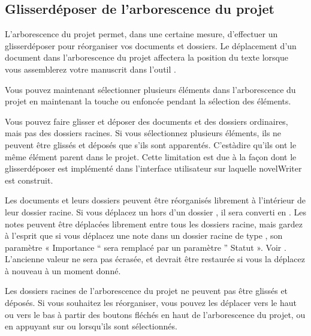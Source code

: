 \documentclass[a4paper,11pt,french]{sphinxmanual}
\begin{document}
\subsection{Glisser\sphinxhyphen{}déposer de l’arborescence du projet}
\label{\detokenize{usage_project:project-tree-drag-drop}}\label{\detokenize{usage_project:a-ui-tree-dnd}}
\sphinxAtStartPar
L’arborescence du projet permet, dans une certaine mesure, d’effectuer un glisser\sphinxhyphen{}déposer pour réorganiser vos documents et dossiers. Le déplacement d’un document dans l’arborescence du projet affectera la position du texte lorsque vous assemblerez votre manuscrit dans l’outil .

\sphinxAtStartPar
{}Vous pouvez maintenant sélectionner plusieurs éléments dans l’arborescence du projet en maintenant la touche  ou  enfoncée pendant la sélection des éléments.

\sphinxAtStartPar
Vous pouvez faire glisser et déposer des documents et des dossiers ordinaires, mais pas des dossiers racines. Si vous sélectionnez plusieurs éléments, ils ne peuvent être glissés et déposés que s’ils sont apparentés. C’est\sphinxhyphen{}à\sphinxhyphen{}dire qu’ils ont le même élément parent dans le projet. Cette limitation est due à la façon dont le glisser\sphinxhyphen{}déposer est implémenté dans l’interface utilisateur sur laquelle novelWriter est construit.

\sphinxAtStartPar
Les documents et leurs dossiers peuvent être réorganisés librement à l’intérieur de leur dossier racine. Si vous déplacez un  hors d’un dossier , il sera converti en . Les notes peuvent être déplacées librement entre tous les dossiers racine, mais gardez à l’esprit que si vous déplacez une note dans un dossier racine de type , son paramètre « Importance “ sera remplacé par un paramètre ” Statut ». Voir {\hyperref[\detokenize{usage_project:a-ui-tree-status}]{}}. L’ancienne valeur ne sera pas écrasée, et devrait être restaurée si vous la déplacez à nouveau à un moment donné.

\sphinxAtStartPar
Les dossiers racines de l’arborescence du projet ne peuvent pas être glissés et déposés. Si vous souhaitez les réorganiser, vous pouvez les déplacer vers le haut ou vers le bas à partir des boutons fléchés en haut de l’arborescence du projet, ou en appuyant sur  ou  lorsqu’ils sont sélectionnés.
\end{document}
